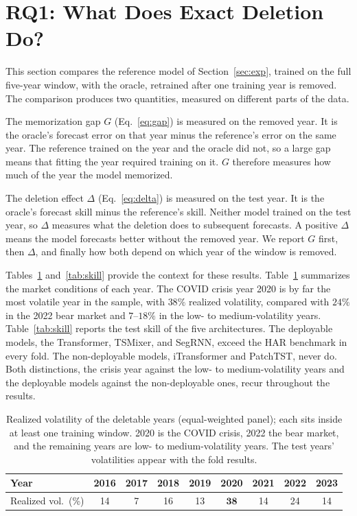 \section{RQ1: What Does Exact Deletion Do?}\label{sec:rq1}

This section compares the reference model of Section~\ref{sec:exp},
trained on the full five-year window, with the oracle, retrained
after one training year is removed. The comparison produces two
quantities, measured on different parts of the data.

The memorization gap $G$ (Eq.~\ref{eq:gap}) is measured on the
removed year. It is the oracle's forecast error on that year minus
the reference's error on the same year. The reference trained on the
year and the oracle did not, so a large gap means that fitting the
year required training on it. $G$ therefore measures how much of the
year the model memorized.

The deletion effect $\Delta$ (Eq.~\ref{eq:delta}) is measured on the
test year. It is the oracle's forecast skill minus the reference's
skill. Neither model trained on the test year, so $\Delta$ measures
what the deletion does to subsequent forecasts. A positive $\Delta$
means the model forecasts better without the removed year. We report
$G$ first, then $\Delta$, and finally how both depend on which year
of the window is removed.

Tables~\ref{tab:years} and~\ref{tab:skill} provide the context for
these results. Table~\ref{tab:years} summarizes the market conditions
of each year. The COVID crisis year 2020 is by far the most volatile
year in the sample, with $38\%$ realized volatility, compared with
$24\%$ in the 2022 bear market and $7$--$18\%$ in the low- to
medium-volatility years.
Table~\ref{tab:skill} reports the test skill of the five
architectures. The deployable models, the Transformer, TSMixer, and
SegRNN, exceed the HAR benchmark in every fold. The non-deployable
models, iTransformer and PatchTST, never do. Both distinctions, the
crisis year against the low- to medium-volatility years and the
deployable models against the non-deployable ones, recur throughout
the results.

\begin{table}[t]
\caption{Realized volatility of the deletable years
(equal-weighted panel); each sits inside at least one training
window. 2020 is the COVID crisis, 2022 the bear market, and the
remaining years are low- to medium-volatility years. The test
years' volatilities appear with the fold results.}
\label{tab:years}
\centering
\setlength{\tabcolsep}{3.6pt}
\footnotesize
\begin{tabular}{lcccccccc}
\toprule
Year & 2016 & 2017 & 2018 & 2019 & \textbf{2020} & 2021 & 2022 & 2023\\
\midrule
Realized vol.\ (\%) & 14 & 7 & 16 & 13 & $\mathbf{38}$ & 14 & 24 & 14\\
\bottomrule
\end{tabular}
\end{table}

